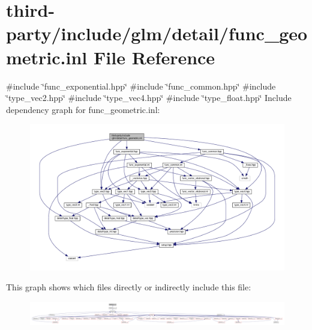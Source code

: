 \hypertarget{func__geometric_8inl}{}\section{third-\/party/include/glm/detail/func\+\_\+geometric.inl File Reference}
\label{func__geometric_8inl}
{\ttfamily \#include \char`\"{}func\+\_\+exponential.\+hpp\char`\"{}}\newline
{\ttfamily \#include \char`\"{}func\+\_\+common.\+hpp\char`\"{}}\newline
{\ttfamily \#include \char`\"{}type\+\_\+vec2.\+hpp\char`\"{}}\newline
{\ttfamily \#include \char`\"{}type\+\_\+vec4.\+hpp\char`\"{}}\newline
{\ttfamily \#include \char`\"{}type\+\_\+float.\+hpp\char`\"{}}\newline
Include dependency graph for func\+\_\+geometric.\+inl\+:
\nopagebreak
\begin{figure}[H]
\begin{center}
\leavevmode
\includegraphics[width=350pt]{func__geometric_8inl__incl}
\end{center}
\end{figure}
This graph shows which files directly or indirectly include this file\+:
\nopagebreak
\begin{figure}[H]
\begin{center}
\leavevmode
\includegraphics[width=350pt]{func__geometric_8inl__dep__incl}
\end{center}
\end{figure}
